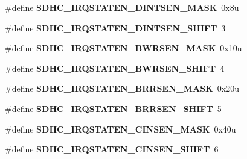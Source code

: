 \begin{DoxyCompactItemize}
\item 
\hypertarget{group___s_d_h_c___register___masks_ga3e226429fe18b447810a75373b0e4e80}{}\#define {\bfseries S\+D\+H\+C\+\_\+\+I\+R\+Q\+S\+T\+A\+T\+E\+N\+\_\+\+D\+I\+N\+T\+S\+E\+N\+\_\+\+M\+A\+S\+K}~0x8u\label{group___s_d_h_c___register___masks_ga3e226429fe18b447810a75373b0e4e80}

\item 
\hypertarget{group___s_d_h_c___register___masks_ga7a2afc379b13fa392c324274ccf3c313}{}\#define {\bfseries S\+D\+H\+C\+\_\+\+I\+R\+Q\+S\+T\+A\+T\+E\+N\+\_\+\+D\+I\+N\+T\+S\+E\+N\+\_\+\+S\+H\+I\+F\+T}~3\label{group___s_d_h_c___register___masks_ga7a2afc379b13fa392c324274ccf3c313}

\item 
\hypertarget{group___s_d_h_c___register___masks_gab61d7d78bdcc89f1ae03332eae100736}{}\#define {\bfseries S\+D\+H\+C\+\_\+\+I\+R\+Q\+S\+T\+A\+T\+E\+N\+\_\+\+B\+W\+R\+S\+E\+N\+\_\+\+M\+A\+S\+K}~0x10u\label{group___s_d_h_c___register___masks_gab61d7d78bdcc89f1ae03332eae100736}

\item 
\hypertarget{group___s_d_h_c___register___masks_ga8d3fbb4324645ec6117b77a592000680}{}\#define {\bfseries S\+D\+H\+C\+\_\+\+I\+R\+Q\+S\+T\+A\+T\+E\+N\+\_\+\+B\+W\+R\+S\+E\+N\+\_\+\+S\+H\+I\+F\+T}~4\label{group___s_d_h_c___register___masks_ga8d3fbb4324645ec6117b77a592000680}

\item 
\hypertarget{group___s_d_h_c___register___masks_ga158351e2d7c3b799b7e1de2231b2721e}{}\#define {\bfseries S\+D\+H\+C\+\_\+\+I\+R\+Q\+S\+T\+A\+T\+E\+N\+\_\+\+B\+R\+R\+S\+E\+N\+\_\+\+M\+A\+S\+K}~0x20u\label{group___s_d_h_c___register___masks_ga158351e2d7c3b799b7e1de2231b2721e}

\item 
\hypertarget{group___s_d_h_c___register___masks_ga994be2975fe8bfcfa36b677c8857764a}{}\#define {\bfseries S\+D\+H\+C\+\_\+\+I\+R\+Q\+S\+T\+A\+T\+E\+N\+\_\+\+B\+R\+R\+S\+E\+N\+\_\+\+S\+H\+I\+F\+T}~5\label{group___s_d_h_c___register___masks_ga994be2975fe8bfcfa36b677c8857764a}

\item 
\hypertarget{group___s_d_h_c___register___masks_ga28f8bc13ff1f5a489e41a54dc39e3152}{}\#define {\bfseries S\+D\+H\+C\+\_\+\+I\+R\+Q\+S\+T\+A\+T\+E\+N\+\_\+\+C\+I\+N\+S\+E\+N\+\_\+\+M\+A\+S\+K}~0x40u\label{group___s_d_h_c___register___masks_ga28f8bc13ff1f5a489e41a54dc39e3152}

\item 
\hypertarget{group___s_d_h_c___register___masks_gad0123206a003e799cb7aa8523ecd405c}{}\#define {\bfseries S\+D\+H\+C\+\_\+\+I\+R\+Q\+S\+T\+A\+T\+E\+N\+\_\+\+C\+I\+N\+S\+E\+N\+\_\+\+S\+H\+I\+F\+T}~6\label{group___s_d_h_c___register___masks_gad0123206a003e799cb7aa8523ecd405c}


\end{DoxyCompactItemize}
